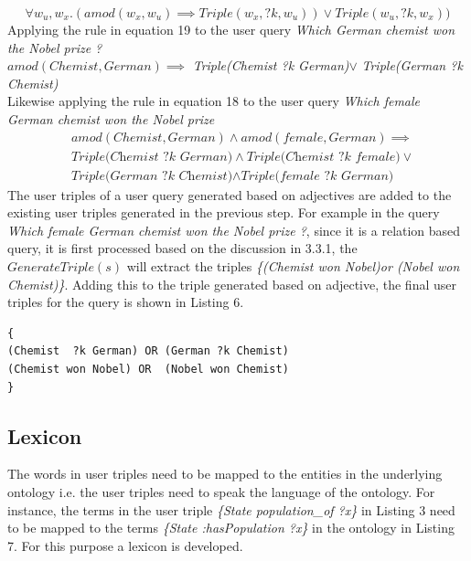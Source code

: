 \documentclass[review]{elsarticle}
\begin{document}
\begin{equation}
 \forall  w_u,w_x.(amod(w_x,w_u)\implies Triple(w_x,?k, w_u))\lor Triple(w_u,?k, w_x))
\end{equation}
Applying the rule in equation 19  to the user  query  \textit{Which German chemist won the Nobel prize ?}\\
$amod(Chemist, German)\implies$ \textit{Triple(Chemist ?k German)}$\lor$ \textit{Triple(German ?k Chemist)} \\
Likewise applying the rule in equation 18 to the user  query  \textit{Which female German chemist won the Nobel prize}\\
\begin{equation*}
\begin{split}
&amod(Chemist, German)\land amod(female, German)\implies\\
&\textit{Triple(Chemist ?k German)} \land \textit{Triple(Chemist ?k female)}\lor\\
&\textit{Triple(German ?k Chemist)} \land \textit{Triple(female ?k German)}
\end{split}
\end{equation*}
The user triples of a user query generated based on adjectives are added to the existing user triples generated in the previous step.  For example in the query \textit{Which female German chemist won the Nobel prize ?},  since it is a relation based query,  it is first processed  based on the discussion in 3.3.1,  the $GenerateTriple(s)$ will extract the triples \textit{\{(Chemist won Nobel)or (Nobel won Chemist)\}}. Adding this to the triple generated based on adjective, the final user triples for the query is shown  in Listing 6.

\begin{lstlisting}[caption= User triples]
{
(Chemist  ?k German) OR (German ?k Chemist)
(Chemist won Nobel) OR  (Nobel won Chemist)
}
\end{lstlisting}
\subsection{Lexicon}
The words in user triples need to be mapped to the entities in the underlying ontology i.e. the user triples need to speak the language of the ontology. For instance, the terms in the user triple
\textit{\{State population\_of ?x\}}  in Listing 3  need to be mapped to the terms  \textit{\{State :hasPopulation ?x\}} in the ontology in  Listing 7.  For this purpose  a lexicon is developed. 
\end{document}

